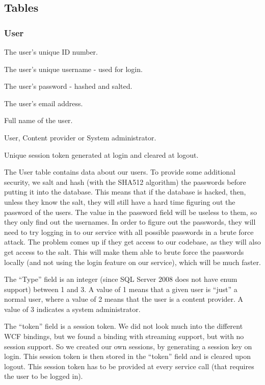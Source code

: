 \subsection{Tables}
\label{Design_Database_Tables}

\subsubsection{User}
\label{Design_Database_Tables_User}

\begin{my_description}
\item[user\_id] The user's unique ID number.
\item[username] The user's unique username - used for login.
\item[password] The user's password - hashed and salted.
\item[email] The user's email address.
\item[full\_name] Full name of the user.
\item[type] User, Content provider or System administrator.
\item[token] Unique session token generated at login and cleared at logout.
\end{my_description}

The User table contains data about our users. To provide some additional security, we salt and hash (with the SHA512 algorithm) the passwords before putting it into the database. This means that if the database is hacked, then, unless they know the salt, they will still have a hard time figuring out the password of the users. The value in the password field will be useless to them, so they only find out the usernames. In order to figure out the passwords, they will need to try logging in to our service with all possible passwords in a brute force attack. The problem comes up if they get access to our codebase, as they will also get access to the salt. This will make them able to brute force the passwords locally (and not using the login feature on our service), which will be much faster.

The ``Type'' field is an integer (since SQL Server 2008 does not have enum support) between 1 and 3. A value of 1 means that a given user is ``just'' a normal user, where a value of 2 means that the user is a content provider. A value of 3 indicates a system administrator.

The ``token'' field is a session token. We did not look much into the different WCF bindings, but we found a binding with streaming support, but with no session support. So we created our own sessions, by generating a session key on login. This session token is then stored in the ``token'' field and is cleared upon logout. This session token has to be provided at every service call (that requires the user to be logged in).


